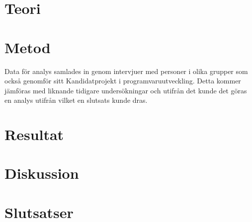 \section{Teori}
\label{sec:theory-person}


\section{Metod}
\label{sec:method-person}

Data för analys samlades in genom intervjuer med personer i olika grupper som också genomför sitt Kandidatprojekt i programvaruutveckling. Detta kommer jämföras med liknande tidigare undersökningar och utifrån det kunde det göras en analys utifrån vilket en slutsats kunde dras.

\section{Resultat}
\label{sec:results-person}


\section{Diskussion}
\label{sec:discussion-person}


\section{Slutsatser}
\label{sec:conclusions-person}


